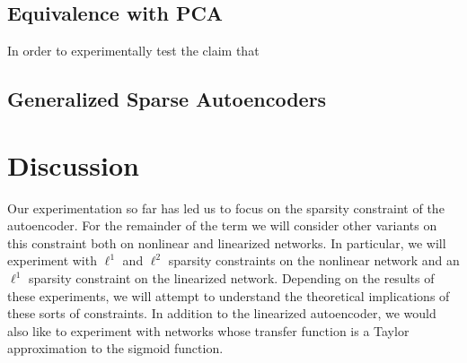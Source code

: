 \documentclass[twocolumn]{article}
\begin{document}
\subsection{Equivalence with PCA}
In order to experimentally test the claim that 
\subsection{Generalized Sparse Autoencoders}

\section{Discussion}
Our experimentation so far has led us to focus on the sparsity constraint of the
autoencoder.  For the remainder of the term we will consider other variants on
this constraint both on nonlinear and linearized networks. In particular, we
will experiment with $\ell^1$ and $\ell^2$ sparsity constraints on the nonlinear
network and an $\ell^1$ sparsity constraint on the linearized network. Depending
on the results of these experiments, we will attempt to understand the
theoretical implications of these sorts of constraints. In addition to the
linearized autoencoder, we would also like to experiment with networks whose
transfer function is a Taylor approximation to the sigmoid function.

\end{document}
